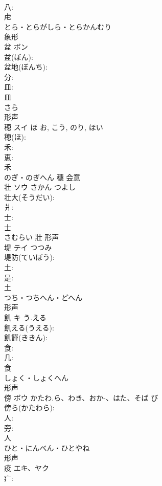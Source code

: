 \documentclass[8pt]{extreport}
\begin{document}
\begin{CJK}{UTF8}{min}
\\	八: 
\\	虍	
\\	とら・とらがしら・とらかんむり	
\\	象形 
\\	盆	ボン			
\\	盆(ぼん): 
\\	盆地(ぼんち): 
\\	分: 
\\	皿: 
\\	皿	
\\	さら	
\\	形声 
\\	穂	スイ	ほ	お, こう, のり, ほい	
\\	穂(ほ): 
\\	禾: 
\\	恵: 
\\	禾	
\\	のぎ・のぎへん	穗	会意 
\\	壮	ソウ	さかん	つよし	
\\	壮大(そうだい): 
\\	爿: 
\\	士: 
\\	士	
\\	さむらい	壯	形声 
\\	堤	テイ	つつみ		
\\	堤防(ていぼう): 
\\	土: 
\\	是: 
\\	土	
\\	つち・つちへん・どへん	
\\	形声 
\\	飢	キ	う.える		
\\	飢える(うえる): 
\\	飢饉(ききん): 
\\	食: 
\\	几: 
\\	食	
\\	しょく・しょくへん	
\\	形声 
\\	傍	ボウ	かたわ.ら、わき、おか-、はた、そば	び	
\\	傍ら(かたわら): 
\\	人: 
\\	旁: 
\\	人	
\\	ひと・にんべん・ひとやね	
\\	形声 
\\	疫	エキ、ヤク			
\\	疒: 

\end{CJK}
\end{document}
